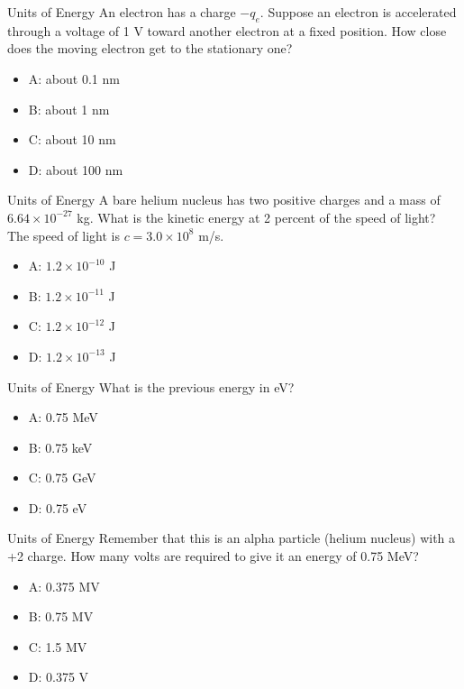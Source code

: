 \documentclass{beamer}
\begin{document}
\begin{frame}{Units of Energy}
An electron has a charge $-q_e$.  Suppose an electron is accelerated through a voltage of 1 V toward another electron at a fixed position.  How close does the moving electron get to the stationary one?
\begin{itemize}
\item A: about 0.1 nm
\item B: about 1 nm
\item C: about 10 nm
\item D: about 100 nm
\end{itemize}
\end{frame}

\begin{frame}{Units of Energy}
A bare helium nucleus has two positive charges and a mass of $6.64 \times 10^{-27}$ kg.  What is the kinetic energy at 2 percent of the speed of light?  The speed of light is $c = 3.0 \times 10^{8}$ m/s.
\begin{itemize}
\item A: $1.2 \times 10^{-10}$ J
\item B: $1.2 \times 10^{-11}$ J
\item C: $1.2 \times 10^{-12}$ J
\item D: $1.2 \times 10^{-13}$ J
\end{itemize}
\end{frame}

\begin{frame}{Units of Energy}
What is the previous energy in eV?
\begin{itemize}
\item A: 0.75 MeV
\item B: 0.75 keV
\item C: 0.75 GeV
\item D: 0.75 eV
\end{itemize}
\end{frame}

\begin{frame}{Units of Energy}
Remember that this is an alpha particle (helium nucleus) with a +2 charge.  How many volts are required to give it an energy of 0.75 MeV?
\begin{itemize}
\item A: 0.375 MV
\item B: 0.75 MV
\item C: 1.5 MV
\item D: 0.375 V
\end{itemize}
\end{frame}
\end{document}
